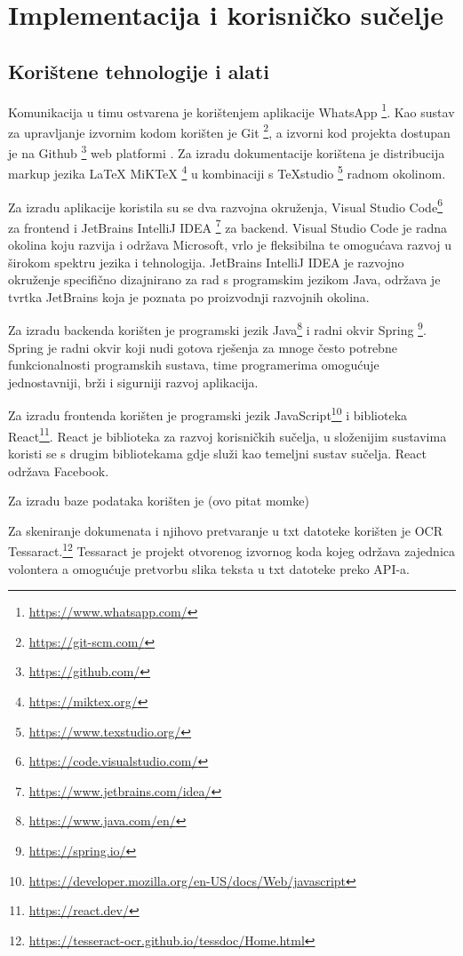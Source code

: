 \chapter{Implementacija i korisničko sučelje}
		
		
		\section{Korištene tehnologije i alati}
		
		
			Komunikacija u timu ostvarena je korištenjem aplikacije WhatsApp \footnote{\url{https://www.whatsapp.com/}}. Kao sustav za upravljanje izvornim kodom korišten je Git \footnote{\url{https://git-scm.com/}}, a izvorni kod projekta dostupan je na Github \footnote{\url{https://github.com/}} web platformi . Za izradu dokumentacije korištena je distribucija markup jezika LaTeX MiKTeX \footnote{\url{https://miktex.org/}}  u kombinaciji s TeXstudio \footnote{\url{https://www.texstudio.org/}} radnom okolinom.
				
			Za izradu aplikacije koristila su se dva razvojna okruženja, Visual Studio Code\footnote{\url{https://code.visualstudio.com/}} za frontend i JetBrains IntelliJ IDEA \footnote{\url{https://www.jetbrains.com/idea/}} za backend. Visual Studio Code je radna okolina koju razvija i održava Microsoft, vrlo je fleksibilna te omogućava razvoj u širokom spektru jezika i tehnologija. JetBrains IntelliJ IDEA je razvojno okruženje specifično dizajnirano za rad s programskim jezikom Java, održava je tvrtka JetBrains koja je poznata po proizvodnji razvojnih okolina.
			
			Za izradu backenda korišten je programski jezik Java\footnote{\url{https://www.java.com/en/}} i radni okvir Spring \footnote{\url{https://spring.io/}}. Spring je radni okvir koji nudi gotova rješenja za mnoge često potrebne funkcionalnosti programskih sustava, time programerima omogućuje jednostavniji, brži i sigurniji razvoj aplikacija. 
			
			Za izradu frontenda korišten je programski jezik JavaScript\footnote{\url{https://developer.mozilla.org/en-US/docs/Web/javascript}} i biblioteka React\footnote{\url{https://react.dev/}}. React je biblioteka za razvoj korisničkih sučelja, u složenijim sustavima koristi se s drugim bibliotekama gdje služi kao temeljni sustav sučelja. React održava Facebook.
			
			Za izradu baze podataka korišten je (ovo pitat momke)
			
			Za skeniranje dokumenata i njihovo pretvaranje u txt datoteke korišten je OCR Tessaract.\footnote{\url{https://tesseract-ocr.github.io/tessdoc/Home.html}} Tessaract je projekt otvorenog izvornog koda kojeg održava zajednica volontera a omogućuje pretvorbu slika teksta u txt datoteke preko API-a.
			
